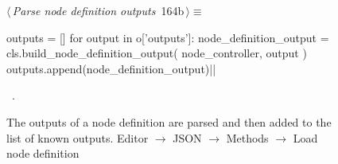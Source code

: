 \documentclass[%
    a4paper,    %
    justified,  %
    nobib,      %
    openany     %
]{tufte-book}
\makeatletter
\renewcommand{\label}[1]{\@tufte@label{##1}}%
\makeatother
\begin{document}
\begin{figure}[!htbp]
\begin{flushleft} \small
\begin{minipage}{\linewidth}\label{scrap127}\raggedright\small
{} $\langle\,${\itshape Parse node definition outputs}\nobreak\ {\footnotesize {164b}}$\,\rangle\equiv$
\vspace{-1ex}
\begin{pythoncode}
outputs = []
for output in o['outputs']:
    node_definition_output = cls.build_node_definition_output(
        node_controller, output
    )
    outputs.append(node_definition_output)|\NWsep|
\end{pythoncode}
\vspace{1.5ex}
\footnotesize
\begin{list}{}{\setlength{\itemsep}{-\parsep}\setlength{\itemindent}{-\leftmargin}}
\item \NWtxtMacroRefIn\ .

\item{}
\end{list}
\end{minipage}\vspace{4ex}
\end{flushleft}
\caption{The outputs of a node definition are parsed and then added to
the list of known outputs.
  \newline{}\newline{}Editor $\rightarrow$ JSON $\rightarrow$
  Methods $\rightarrow$ Load node definition}
\end{figure}
\end{document}
